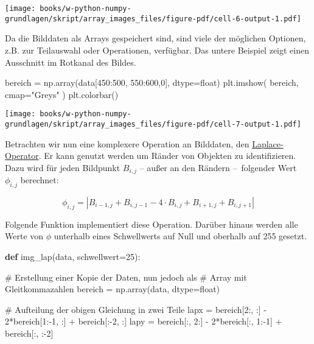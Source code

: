 \documentclass[
  letterpaper,
  DIV=11,
  numbers=noendperiod]{scrreprt}
\newenvironment{Shaded}{\begin{snugshade}}{\end{snugshade}}
\newcommand{\BuiltInTok}[1]{\textcolor[rgb]{0.00,0.23,0.31}{#1}}
\newcommand{\CommentTok}[1]{\textcolor[rgb]{0.37,0.37,0.37}{#1}}
\newcommand{\DecValTok}[1]{\textcolor[rgb]{0.68,0.00,0.00}{#1}}
\newcommand{\KeywordTok}[1]{\textcolor[rgb]{0.00,0.23,0.31}{\textbf{#1}}}
\newcommand{\NormalTok}[1]{\textcolor[rgb]{0.00,0.23,0.31}{#1}}
\newcommand{\OperatorTok}[1]{\textcolor[rgb]{0.37,0.37,0.37}{#1}}
\newcommand{\StringTok}[1]{\textcolor[rgb]{0.13,0.47,0.30}{#1}}
\begin{document}
\begin{tcolorbox}
\texttt{[image: books/w-python-numpy-grundlagen/skript/array\_images\_files/figure-pdf/cell-6-output-1.pdf]}

Da die Bilddaten als Arrays gespeichert sind, sind viele der möglichen
Optionen, z.B. zur Teilauswahl oder Operationen, verfügbar. Das untere
Beispiel zeigt einen Ausschnitt im Rotkanal des Bildes.

\begin{Shaded}
\begin{Highlighting}[]
\NormalTok{bereich }\OperatorTok{=}\NormalTok{ np.array(data[}\DecValTok{450}\NormalTok{:}\DecValTok{500}\NormalTok{, }\DecValTok{550}\NormalTok{:}\DecValTok{600}\NormalTok{,}\DecValTok{0}\NormalTok{], dtype}\OperatorTok{=}\BuiltInTok{float}\NormalTok{)}
\NormalTok{plt.imshow( bereich, cmap}\OperatorTok{=}\StringTok{"Greys"}\NormalTok{ )}
\NormalTok{plt.colorbar()}
\end{Highlighting}
\end{Shaded}

\texttt{[image: books/w-python-numpy-grundlagen/skript/array\_images\_files/figure-pdf/cell-7-output-1.pdf]}

Betrachten wir nun eine komplexere Operation an Bilddaten, den
\href{https://de.wikipedia.org/wiki/Laplace-Operator}{Laplace-Operator}.
Er kann genutzt werden um Ränder von Objekten zu identifizieren. Dazu
wird für jeden Bildpunkt \(B_{i,j}\) -- außer an den Rändern
--~folgender Wert \(\phi_{i, j}\) berechnet:

\[ \phi_{i, j} = \left|B_{i-1, j} + B_{i, j-1} - 4\cdot B_{i, j} + B_{i+1, j} + B_{i, j+1}\right| \]

Folgende Funktion implementiert diese Operation. Darüber hinaus werden
alle Werte von \(\phi\) unterhalb eines Schwellwerts auf Null und
oberhalb auf 255 gesetzt.

\begin{Shaded}
\begin{Highlighting}[]
\KeywordTok{def}\NormalTok{ img\_lap(data, schwellwert}\OperatorTok{=}\DecValTok{25}\NormalTok{):}
    
    \CommentTok{\# Erstellung einer Kopie der Daten, nun jedoch als}
    \CommentTok{\# Array mit Gleitkommazahlen}
\NormalTok{    bereich }\OperatorTok{=}\NormalTok{ np.array(data, dtype}\OperatorTok{=}\BuiltInTok{float}\NormalTok{)}
    
    \CommentTok{\# Aufteilung der obigen Gleichung in zwei Teile}
\NormalTok{    lapx }\OperatorTok{=}\NormalTok{ bereich[}\DecValTok{2}\NormalTok{:, :] }\OperatorTok{{-}} \DecValTok{2}\OperatorTok{*}\NormalTok{bereich[}\DecValTok{1}\NormalTok{:}\OperatorTok{{-}}\DecValTok{1}\NormalTok{, :] }\OperatorTok{+}\NormalTok{ bereich[:}\OperatorTok{{-}}\DecValTok{2}\NormalTok{, :]}
\NormalTok{    lapy }\OperatorTok{=}\NormalTok{ bereich[:, }\DecValTok{2}\NormalTok{:] }\OperatorTok{{-}} \DecValTok{2}\OperatorTok{*}\NormalTok{bereich[:, }\DecValTok{1}\NormalTok{:}\OperatorTok{{-}}\DecValTok{1}\NormalTok{] }\OperatorTok{+}\NormalTok{ bereich[:, :}\OperatorTok{{-}}\DecValTok{2}\NormalTok{]}
    

\end{Highlighting}
\end{Shaded}
\end{tcolorbox}
\end{document}
